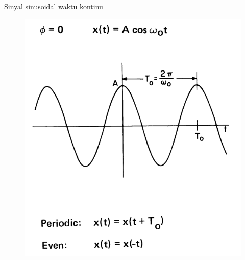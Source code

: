 \documentclass[pdflatex,compress,mathserif]{beamer}
\begin{document}
\begin{frame}{Sinyal sinusoidal waktu kontinu}
	\begin{figure}
		\centering
		\includegraphics[height=0.8\textheight]{img/01.slide_03}
	\end{figure}
\end{frame}
\end{document}
